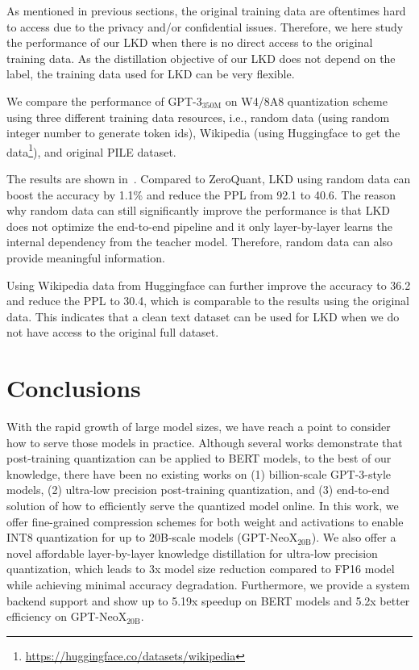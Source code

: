 As mentioned in previous sections, the original training data are oftentimes hard to access due to the privacy and/or confidential issues. Therefore, we here study the performance of our LKD when there is no direct access to the original training data. As the distillation objective of our LKD does not depend on the label, the training data used for LKD can be very flexible. 

We compare the performance of GPT-3$_{\text{350M}}$ on W4/8A8 quantization scheme using three different training data resources, i.e., random data (using random integer number to generate token ids), Wikipedia (using Huggingface to get the data\footnote{\url{https://huggingface.co/datasets/wikipedia}}), and original PILE dataset. 

The results are shown in~. 
Compared to ZeroQuant, LKD using random data can boost the accuracy by 1.1\% and reduce the PPL from 92.1 to 40.6. The reason why random data can still significantly improve the performance is that LKD does not optimize the end-to-end pipeline and it only layer-by-layer learns the internal dependency from the teacher model. Therefore, random data can also provide meaningful information.

Using Wikipedia data from Huggingface can further improve the accuracy to 36.2 and reduce the PPL to 30.4, which is comparable to the results using the original data. This indicates that a clean text dataset can be used for LKD when we do not have access to the original full dataset. 

\section{Conclusions}
\label{sec:conclusions}

With the rapid growth of large model sizes, we have reach a point to consider how to serve those models in practice. Although several works demonstrate that post-training quantization can be applied to BERT models, to the best of our knowledge, there have been no existing works on (1) billion-scale GPT-3-style models, (2) ultra-low precision post-training quantization, and (3) end-to-end solution of how to efficiently serve the quantized model online. In this work, we offer fine-grained compression schemes for both weight and activations to enable INT8 quantization for up to 20B-scale models (GPT-NeoX$_{\text{20B}}$). 
We also offer a novel affordable layer-by-layer knowledge distillation for ultra-low precision quantization, which leads to 3x model size reduction compared to FP16 model while achieving minimal accuracy degradation. Furthermore, we provide a system backend support and show up to 5.19x speedup on BERT models and 5.2x better efficiency on GPT-NeoX$_{\text{20B}}$.


